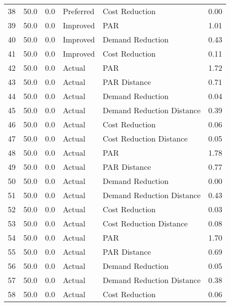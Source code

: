 \begin{longtable}{lrrllr}
38   &         50.0 &     0.0 &      Preferred &             Cost Reduction &   0.00 \\
39   &         50.0 &     0.0 &       Improved &                        PAR &   1.01 \\
40   &         50.0 &     0.0 &       Improved &           Demand Reduction &   0.43 \\
41   &         50.0 &     0.0 &       Improved &             Cost Reduction &   0.11 \\
42   &         50.0 &     0.0 &         Actual &                        PAR &   1.72 \\
43   &         50.0 &     0.0 &         Actual &               PAR Distance &   0.71 \\
44   &         50.0 &     0.0 &         Actual &           Demand Reduction &   0.04 \\
45   &         50.0 &     0.0 &         Actual &  Demand Reduction Distance &   0.39 \\
46   &         50.0 &     0.0 &         Actual &             Cost Reduction &   0.06 \\
47   &         50.0 &     0.0 &         Actual &    Cost Reduction Distance &   0.05 \\
48   &         50.0 &     0.0 &         Actual &                        PAR &   1.78 \\
49   &         50.0 &     0.0 &         Actual &               PAR Distance &   0.77 \\
50   &         50.0 &     0.0 &         Actual &           Demand Reduction &   0.00 \\
51   &         50.0 &     0.0 &         Actual &  Demand Reduction Distance &   0.43 \\
52   &         50.0 &     0.0 &         Actual &             Cost Reduction &   0.03 \\
53   &         50.0 &     0.0 &         Actual &    Cost Reduction Distance &   0.08 \\
54   &         50.0 &     0.0 &         Actual &                        PAR &   1.70 \\
55   &         50.0 &     0.0 &         Actual &               PAR Distance &   0.69 \\
56   &         50.0 &     0.0 &         Actual &           Demand Reduction &   0.05 \\
57   &         50.0 &     0.0 &         Actual &  Demand Reduction Distance &   0.38 \\
58   &         50.0 &     0.0 &         Actual &             Cost Reduction &   0.06 \\

\end{longtable}
